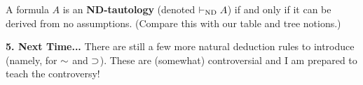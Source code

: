 \documentclass[options]{philosophersimprint}
\begin{document}
A formula $A$ is an \textbf{ND-tautology} (denoted $\vdash_{\mathrm{ND}} A$) if and only if it can be derived from no assumptions. (Compare this with our table and tree notions.)

\textbf{5. Next Time...} There are still a few more natural deduction rules to introduce (namely, for $\mathord{\sim}$ and $\mathbin{\supset}$). These are (somewhat) controversial and I am prepared to teach the controversy!
\end{document}
